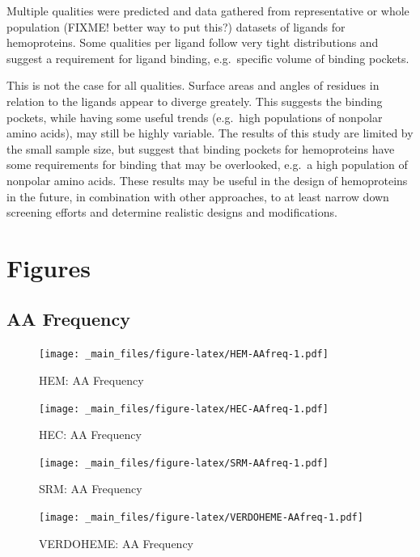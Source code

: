 \documentclass[a4paper, nobind]{templates/ociamthesis}
\begin{document}
Multiple qualities were predicted and data gathered from representative or whole population (FIXME! better way to put this?) datasets of ligands for hemoproteins. Some qualities per ligand follow very tight distributions and suggest a requirement for ligand binding, e.g.~specific volume of binding pockets.

This is not the case for all qualities. Surface areas and angles of residues in relation to the ligands appear to diverge greately. This suggests the binding pockets, while having some useful trends (e.g.~high populations of nonpolar amino acids), may still be highly variable.
The results of this study are limited by the small sample size, but suggest that binding pockets for hemoproteins have some requirements for binding that may be overlooked, e.g.~a high population of nonpolar amino acids. These results may be useful in the design of hemoproteins in the future, in combination with other approaches, to at least narrow down screening efforts and determine realistic designs and modifications.

\startappendices

\hypertarget{a-figures}{%
\chapter{Figures}\label{a-figures}}

\hypertarget{figs-aaFreq}{%
\section{AA Frequency}\label{figs-aaFreq}}

\begin{figure}
\centering
\texttt{[image: \_main\_files/figure-latex/HEM-AAfreq-1.pdf]}
\caption{\label{fig:HEM-AAfreq}HEM: AA Frequency}
\end{figure}

\begin{figure}
\centering
\texttt{[image: \_main\_files/figure-latex/HEC-AAfreq-1.pdf]}
\caption{\label{fig:HEC-AAfreq}HEC: AA Frequency}
\end{figure}

\begin{figure}
\centering
\texttt{[image: \_main\_files/figure-latex/SRM-AAfreq-1.pdf]}
\caption{\label{fig:SRM-AAfreq}SRM: AA Frequency}
\end{figure}

\begin{figure}
\centering
\texttt{[image: \_main\_files/figure-latex/VERDOHEME-AAfreq-1.pdf]}
\caption{\label{fig:VERDOHEME-AAfreq}VERDOHEME: AA Frequency}
\end{figure}
\end{document}
